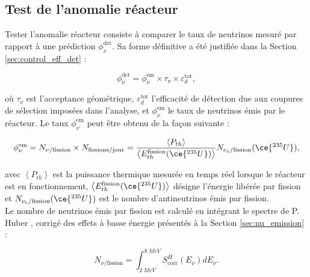 \bigbreak

\subsection{Test de l'anomalie réacteur}

Tester l'anomalie réacteur consiste à comparer le taux de neutrinos mesuré par rapport à une prédiction $\phi_\nu^\textrm{det}$. Sa forme définitive a été justifiée dans la Section \ref{sec:control_eff_det} :

\begin{equation}
    \phi_\nu^{\textrm{det}} = \phi_\nu^{\textrm{em}} \times \tau_\nu \times \varepsilon_d^{\textrm{tot}},
\end{equation}

\bigbreak

où $\tau_\nu$ est l'acceptance géométrique, $\varepsilon_d^{\textrm{tot}}$ l'efficacité de détection due aux coupures de sélection imposées dans l'analyse, et $\phi_\nu^{\textrm{em}}$ le taux de neutrinos émis par le réacteur. Le taux $\phi_\nu^{\textrm{em}}$ peut être obtenu de la façon suivante :

\begin{equation}
    \phi_\nu^\textrm{em} = N_{\nu / \textrm{fission}} \times N_{\textrm{fissions} / \textrm{jour}} = \frac{\left<P_{th}\right>}{\left<E_{th}^{\textrm{fission}} (\ce{^{235}U})\right>} N_{\nu_e / \textrm{fission}}(\ce{^{235}U}),
\end{equation}

\bigbreak

avec $\left<P_{th}\right>$ est la puissance thermique mesurée en temps réel lorsque le réacteur est en fonctionnement, $\left<E_{th}^{\textrm{fission}} (\ce{^{235}U})\right>$ désigne l'énergie libérée par fission et $N_{\nu_e / \textrm{fission}}(\ce{^{235}U})$ est le nombre d'antineutrinos émis par fission.\\

Le nombre de neutrinos émis par fission est calculé en intégrant le spectre de P. Huber \cite{Huber:2011wv}, corrigé des effets à basse énergie présentés à la Section \ref{sec:nu_emission} :

\begin{equation}
    N_{\nu / \textrm{fission}} = \int_{\SI{2}{MeV}}^{\SI{8}{MeV}} S^{H}_\textrm{corr} (E_\nu) dE_\nu .
\end{equation}

\bigbreak

